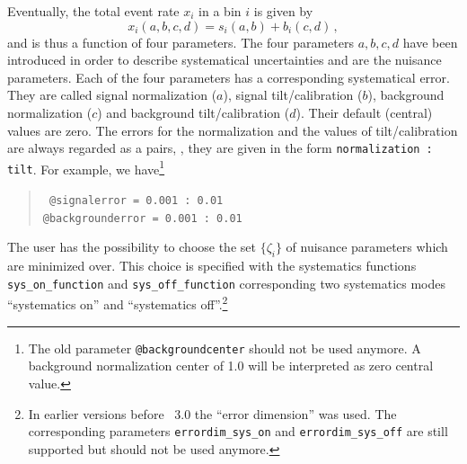Eventually, the total event rate $x_i$ in a bin $i$ is given by
\begin{equation}
x_i(a,b,c,d)=s_i(a,b)+b_i(c,d) \, ,
\end{equation}
and is thus a function of four parameters. 
The four parameters $a,b,c,d$ have been introduced in order to describe
systematical uncertainties and are the nuisance parameters.
Each of the four parameters has a corresponding systematical error.
They are called  signal normalization ($a$), signal tilt/calibration ($b$), 
background  normalization ($c$) and
background tilt/calibration ($d$). Their default (central) values are zero.
The errors for the normalization and the 
values of tilt/calibration are always regarded
as a pairs, \ie, they are given in the form {\tt normalization : tilt}. For example, we have\footnote{The old parameter {\tt @backgroundcenter} should not be used anymore. A background normalization center of 1.0 will be
interpreted as zero central value.}
\begin{quote}
{\tt
\tb @signalerror =       0.001  :       0.01\\
\tb @backgrounderror =   0.001 :       0.01
}
\end{quote}
%
The user has the possibility to choose the set $\{\zeta_i\}$ of nuisance 
parameters which are minimized over. This choice is specified with the 
systematics functions {\tt sys\_on\_function} and {\tt sys\_off\_function}
corresponding two systematics modes ``systematics on'' and ``systematics off''.\footnote{In earlier
versions before \GLOBES\ 3.0 the ``error dimension'' was used. The corresponding
parameters {\tt errordim\_sys\_on} and {\tt errordim\_sys\_off} are still supported
but should not be used anymore.}
